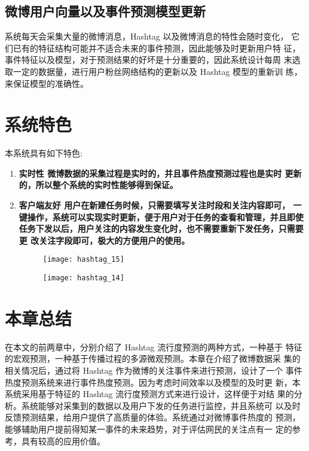 \subsection{微博用户向量以及事件预测模型更新}
系统每天会采集大量的微博消息，Hashtag 以及微博消息的特性会随时变化， 它们已有的特征结构可能并不适合未来的事件预测，因此能够及时更新用户特 征，事件特征以及模型，对于预测结果的好坏是十分重要的，因此系统设计每周 末选取一定的数据量，进行用户粉丝网络结构的更新以及 Hashtag 模型的重新训 练，来保证模型的准确性。


\section{系统特色}
本系统具有如下特色:
\begin{enumerate}
\item  \bfseries 实时性 \mdseries 微博数据的采集过程是实时的，并且事件热度预测过程也是实时 更新的，所以整个系统的实时性能够得到保证。
\item  \bfseries 客户端友好 \mdseries 用户在新建任务时候，只需要填写关注时段和关注内容即可， 一键操作，系统可以实现实时更新，便于用户对于任务的查看和管理，并且即使 任务下发以后，用户关注的内容发生变化时，也不需要重新下发任务，只需要更 改关注字段即可，极大的方便用户的使用。
\begin{figure}[H]
    \centering
    \texttt{[image: hashtag\_15]}
    \label{fig:5_10}
\end{figure}

\begin{figure}[H]
    \centering
    \texttt{[image: hashtag\_14]}
    \label{fig:5_9}
\end{figure}

\end{enumerate}

\section{本章总结}

在本文的前两章中，分别介绍了 Hashtag 流行度预测的两种方式，一种基于 特征的宏观预测，一种基于传播过程的多源微观预测。本章在介绍了微博数据采 集的相关情况后，通过将 Hashtag 作为微博的关注事件来进行预测，设计了一个 事件热度预测系统来进行事件热度预测。因为考虑时间效率以及模型的及时更 新，本系统采用基于特征的 Hashtag 流行度预测方式来进行设计，这样便于对结 果的分析。系统能够对采集到的数据以及用户下发的任务进行监控，并且系统可 以及时反馈预测结果，给用户提供了高质量的体验。系统通过对微博事件热度的 预测，能够辅助用户提前得知某一事件的未来趋势，对于评估网民的关注点有一 定的参考，具有较高的应用价值。